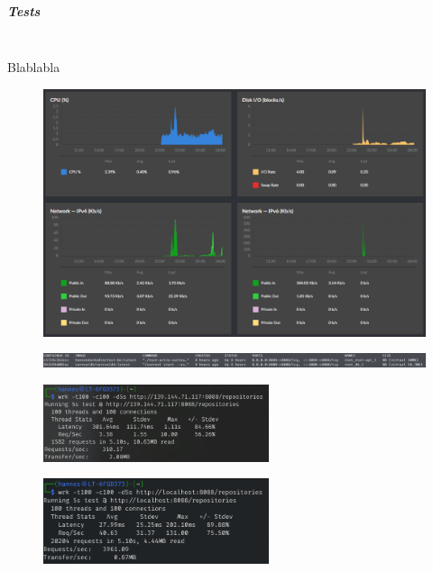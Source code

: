 \documentclass[notitlepage, hidelinks]{article}
\begin{document}
\subparagraph{Tests}  \mbox{} \\
Blablabla

\begin{figure}[H]
\centering
  \includegraphics[width=\textwidth]{images/data2.png}
  \caption{}
  \label{fig:benchmarkone}
\end{figure}


\begin{figure}[H]
\centering
  \includegraphics[width=\textwidth]{images/data4.png}
  \caption{}
  \label{fig:benchmarktwo}
\end{figure}


\begin{figure}[H]
\centering
  \includegraphics[width=250px]{images/data.png}
  \caption{}
  \label{fig:benchmarkthree}
\end{figure}


\begin{figure}[H]
\centering
  \includegraphics[width=250px]{images/data5.png}
  \caption{}
  \label{fig:benchmarkfour}
\end{figure}
\end{document}
